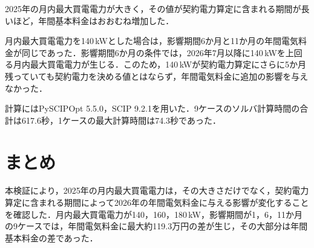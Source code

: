 \documentclass[a4paper,11pt,dvipdfmx]{jsarticle}
\begin{document}

2025年の月内最大買電電力が大きく，その値が契約電力算定に含まれる期間が長いほど，年間基本料金はおおむね増加した．

月内最大買電電力を140\,kWとした場合は，影響期間6か月と11か月の年間電気料金が同じであった．影響期間6か月の条件では，2026年7月以降に140\,kWを上回る月内最大買電電力が生じる．このため，140\,kWが契約電力算定にさらに5か月残っていても契約電力を決める値とはならず，年間電気料金に追加の影響を与えなかった．

計算にはPySCIPOpt 5.5.0，SCIP 9.2.1を用いた．9ケースのソルバ計算時間の合計は617.6秒，1ケースの最大計算時間は74.3秒であった．

\section{まとめ}

本検証により，2025年の月内最大買電電力は，その大きさだけでなく，契約電力算定に含まれる期間によって2026年の年間電気料金に与える影響が変化することを確認した．月内最大買電電力が140，160，180\,kW，影響期間が1，6，11か月の9ケースでは，年間電気料金に最大約119.3万円の差が生じ，その大部分は年間基本料金の差であった．
\end{document}
